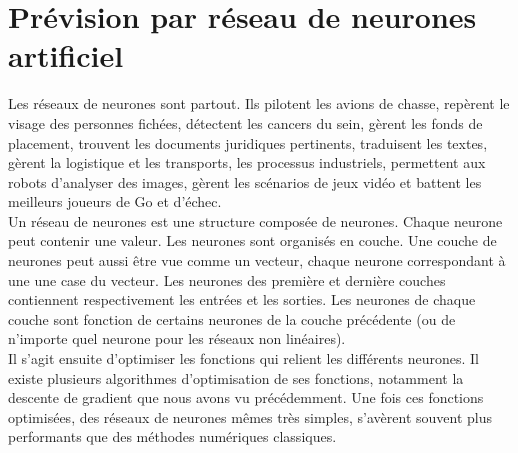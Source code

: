 \documentclass[11pt,a4paper]{article}
\begin{document}
\section {Prévision par réseau de neurones artificiel}
Les réseaux de neurones sont partout. Ils pilotent les avions de chasse, repèrent le visage des personnes fichées, détectent les cancers du sein, gèrent les fonds de placement, trouvent les documents juridiques pertinents, traduisent les textes, gèrent la logistique et les transports, les processus industriels, permettent aux robots d'analyser des images, gèrent les scénarios de jeux vidéo et battent les meilleurs joueurs de Go et d'échec.   \\
Un réseau de neurones est une structure composée de neurones. Chaque neurone peut contenir une valeur. Les neurones sont organisés en couche. Une couche de neurones peut aussi être vue comme un vecteur, chaque neurone correspondant à une une case du vecteur. Les neurones des première et dernière couches contiennent respectivement les entrées et les sorties. Les neurones de chaque couche sont fonction de certains neurones de la couche précédente (ou de n'importe quel neurone pour les réseaux non linéaires). \\
Il s'agit ensuite d'optimiser les fonctions qui relient les différents neurones. Il existe plusieurs algorithmes d'optimisation de ses fonctions, notamment la descente de gradient que nous avons vu précédemment. Une fois ces fonctions optimisées, des réseaux de neurones mêmes très simples, s'avèrent souvent plus performants que des méthodes numériques classiques. 
\end{document}
